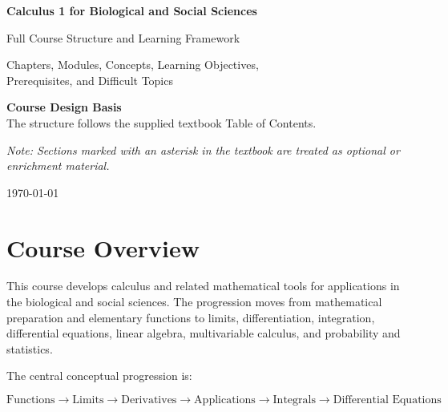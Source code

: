 \documentclass[11pt]{article}
\begin{document}
\begin{titlepage}
    \centering
    \vspace*{1.5cm}

    {\Huge\bfseries Calculus 1 for Biological and Social Sciences\par}
    \vspace{0.5cm}
    {\LARGE Full Course Structure and Learning Framework\par}

    \vspace{1.5cm}

    {\large
    Chapters, Modules, Concepts, Learning Objectives,\\
    Prerequisites, and Difficult Topics
    \par}

    \vfill

    \textbf{Course Design Basis}\\[0.3cm]
    The structure follows the supplied textbook Table of Contents.
    
    \vspace{0.5cm}
    \textit{Note: Sections marked with an asterisk in the textbook
    are treated as optional or enrichment material.}

    \vfill

    {\large \today\par}
\end{titlepage}

\tableofcontents
\newpage


\section{Course Overview}

This course develops calculus and related mathematical tools for
applications in the biological and social sciences. The progression
moves from mathematical preparation and elementary functions to
limits, differentiation, integration, differential equations,
linear algebra, multivariable calculus, and probability and statistics.

The central conceptual progression is:

\[
\boxed{
\text{Functions}
\rightarrow
\text{Limits}
\rightarrow
\text{Derivatives}
\rightarrow
\text{Applications}
\rightarrow
\text{Integrals}
\rightarrow
\text{Differential Equations}
}
\]
\end{document}

